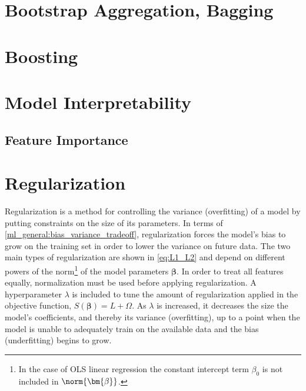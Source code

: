 \section{Bootstrap Aggregation, \texorpdfstring{\ie}{ie} Bagging}
\label{ml_general:bagging}

\section{Boosting}
\label{ml_general:boosting}


\section{Model Interpretability}
\label{ml_general:interp}

\subsection{Feature Importance}
\label{ml_general:interp:feature_importance}

\section{Regularization}
\label{ml_general:reg}

Regularization is a method for controlling the variance (overfitting)
of a model by putting constraints on the size of its parameters.
In terms of \cref{ml_general:bias_variance_tradeoff}, regularization forces the model's
bias to grow on the training set in order to lower the variance on future data.
The two main types of regularization are shown in \cref{eq:L1_L2}
and depend on different powers of the norm\footnote{In
the case of OLS linear regression the constant intercept term $\beta_{0}$ is not included in $\norm{\bm{\beta}}$.} of the model parameters $\bm{\beta}$.
In order to treat all features equally, normalization must be used before applying regularization.
A hyperparameter $\lambda$ is included to tune the amount of regularization applied in the objective function,
$S\left(\bm{\beta}\right) = L + \Omega$.
As $\lambda$ is increased, it decreases the size the model's coefficients, and thereby its variance (overfitting),
up to a point when the model is unable to adequately train on the available data and the bias (underfitting) begins to grow.

